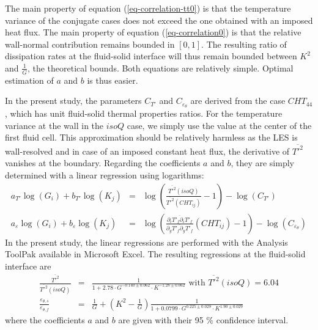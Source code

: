 \documentclass{svjour3}                     %
\begin{document}
The main property of equation (\ref{eq-correlation-tt0}) is that the temperature variance of the conjugate cases does not exceed the one obtained with an imposed heat flux.
The main property of equation (\ref{eq-correlation0}) is that the relative wall-normal contribution remains bounded in $[0,1]$.
The resulting ratio of dissipation rates at the fluid-solid interface will thus remain bounded between $K^2$ and $\frac{1}{G}$, the theoretical bounds.
Both equations are relatively simple.
Optimal estimation of $a$ and $b$ is thus easier.

In the present study, the parameters $C_{T'}$ and $C_{\varepsilon_\theta}$ are derived from the case $CHT_{44}$, which has unit fluid-solid thermal properties ratios.
For the temperature variance at the wall in the $isoQ$ case, we simply use the value at the center of the first fluid cell.
This approximation should be relatively harmless as the LES is wall-resolved and in case of an imposed constant heat flux, the derivative of $\overline{T'^2}$ vanishes at the boundary.
Regarding the coefficients $a$ and $b$, they are simply determined with a linear regression using logarithms:
\begin{eqnarray}
a_{T'} \log \left( G_i \right) + b_{T'} \log \left( K_j \right) & = & \log \left( \frac{\overline{T'^2} \left( isoQ \right)}{\overline{T'^2} \left( CHT_{ij} \right)} - 1 \right) - \log \left( C_{T'} \right) \nonumber \\
a_\varepsilon \log \left( G_i \right) + b_\varepsilon \log \left( K_j \right) & = & \log \left( \frac{ \overline{\partial_i T'_f \partial_i T'_f} } { \overline{\partial_y T'_f \partial_y T'_f} } \left( CHT_{ij} \right) - 1 \right) - \log \left( C_{\varepsilon_\theta} \right)
\end{eqnarray}
In the present study, the linear regressions are performed with the Analysis ToolPak available in Microsoft Excel.
The resulting regressions at the fluid-solid interface are
\begin{eqnarray}
\frac{\overline{T'^2}}{\overline{T'^2} \left( isoQ \right)} & = & \frac{ 1 }{1 + 2.78 \cdot G^{-0.140 \pm 0.062} \cdot K^{-1.28 \pm 0.062}} \mbox{ with } \overline{T'^2} \left( isoQ \right) = 6.04 \label{eq-correlation-tt} \\
\frac{\varepsilon_{\theta,s}}{\varepsilon_{\theta,f}} & = & \frac{1}{G} + \left( K^2 - \frac{1}{G} \right) \frac{1}{1+0.0799 \cdot G^{0.225 \pm 0.029} \cdot K ^{1.90 \pm 0.029}} \label{eq-correlation}
\end{eqnarray}
where the coefficients $a$ and $b$ are given with their 95 \% confidence interval.
\end{document}
